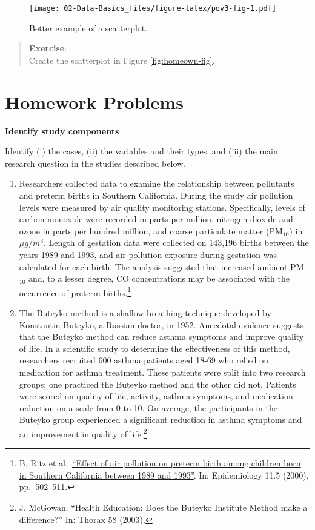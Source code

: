\documentclass[
]{book}
\begin{document}
\begin{figure}
\centering
\texttt{[image: 02-Data-Basics\_files/figure-latex/pov3-fig-1.pdf]}
\caption{\label{fig:pov3-fig}Better example of a scatterplot.}
\end{figure}

\begin{quote}
\textbf{Exercise}:\\
Create the scatterplot in Figure \ref{fig:homeown-fig}.
\end{quote}

\hypertarget{homework-problems-1}{%
\section{Homework Problems}\label{homework-problems-1}}

\textbf{Identify study components}

Identify (i) the cases, (ii) the variables and their types, and (iii) the main research question in the studies described below.

\begin{enumerate}
\def\labelenumi{\arabic{enumi}.}
\item
  Researchers collected data to examine the relationship between pollutants and preterm births in Southern California. During the study air pollution levels were measured by air quality monitoring stations. Specifically, levels of carbon monoxide were recorded in parts per million, nitrogen dioxide and ozone in parts per hundred million, and coarse particulate matter (PM\(_{10}\)) in \(\mu g/m^3\). Length of gestation data were collected on 143,196 births between the years 1989 and 1993, and air pollution exposure during gestation was calculated for each birth. The analysis suggested that increased ambient PM\(_{10}\) and, to a lesser degree, CO concentrations may be associated with the occurrence of preterm births.\footnote{B. Ritz et al.~\href{http://journals.lww.com/epidem/Abstract/2000/09000/Effect_of_Air_Pollution_on_Preterm_Birth_Among.4.aspx}{``Effect of air pollution on preterm birth among children born in Southern California
    between 1989 and 1993''}. In: Epidemiology 11.5 (2000), pp.~502--511.}
\item
  The Buteyko method is a shallow breathing technique developed by Konstantin Buteyko, a Russian doctor, in 1952. Anecdotal evidence suggests that the Buteyko method can reduce asthma symptoms and improve quality of life. In a scientific study to determine the effectiveness of this method, researchers recruited 600 asthma patients aged 18-69 who relied on medication for asthma treatment. These patients were split into two research groups: one practiced the Buteyko method and the other did not. Patients were scored on quality of life, activity, asthma symptoms, and medication reduction on a scale from 0 to 10. On average, the participants in the Buteyko group experienced a significant reduction in asthma symptoms and an improvement in quality of life.\footnote{J. McGowan. ``Health Education: Does the Buteyko Institute Method make a difference?'' In: Thorax 58 (2003).}
\end{enumerate}
\end{document}
